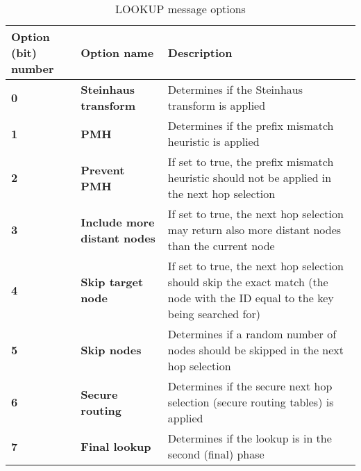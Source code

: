 \begin{table}[H]
\scriptsize
\begin{center}
\begin{tabular}{p{2.7cm} p{3.3cm} p{8.5cm}}
	\hline
	\textbf{Option (bit) number}					& \textbf{Option name}				& \textbf{Description}				\\[1mm]
    \hline
	\textbf{0}								& \textbf{Steinhaus transform}			& Determines if the Steinhaus transform is applied						\\[1.5mm]
    \textbf{1}								& \textbf{PMH}							& Determines if the prefix mismatch heuristic is applied				\\[1.5mm]
	\textbf{2}								& \textbf{Prevent PMH}					& If set to true, the prefix mismatch heuristic should not be applied in the next hop selection			\\[1.5mm]
	\textbf{3}								& \textbf{Include more distant nodes}	& If set to true, the next hop selection may return also more distant nodes than the current node		\\[1.5mm]
	\textbf{4}								& \textbf{Skip target node}				& If set to true, the next hop selection should skip the exact match (the node with the ID equal to the key being searched for)			\\[1.5mm]
	\textbf{5}								& \textbf{Skip nodes}					& Determines if a random number of nodes should be skipped in the next hop selection					\\[1.5mm]
	\textbf{6}								& \textbf{Secure routing}				& Determines if the secure next hop selection (secure routing tables) is applied							\\[1.5mm]
	\textbf{7}								& \textbf{Final lookup}					& Determines if the lookup is in the second (final) phase				\\[1.5mm]	
    \hline
\end{tabular}
\end{center}
\caption{LOOKUP message options}
\label{tab:mLookupOptions}
\end{table}




